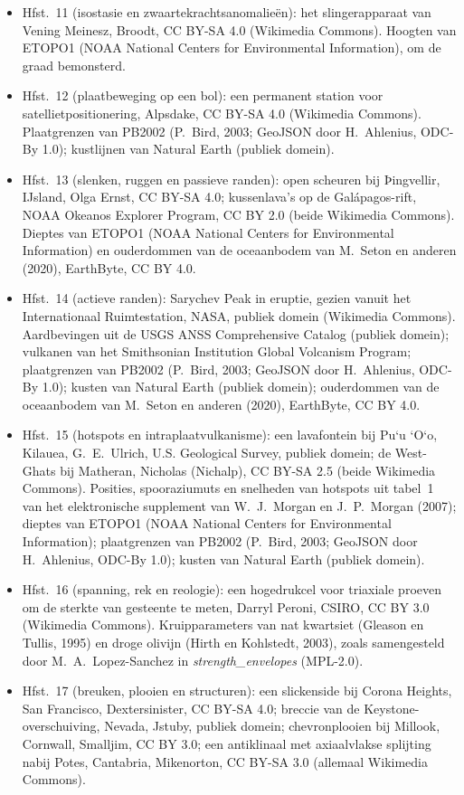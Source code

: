 \begin{itemize}
  \item Hfst.~11 (isostasie en zwaartekrachtsanomalieën): het slingerapparaat van Vening Meinesz, Broodt, CC BY-SA 4.0 (Wikimedia Commons). Hoogten van ETOPO1 (NOAA National Centers for Environmental Information), om de graad bemonsterd.
  \item Hfst.~12 (plaatbeweging op een bol): een permanent station voor satellietpositionering, Alpsdake, CC BY-SA 4.0 (Wikimedia Commons). Plaatgrenzen van PB2002 (P.~Bird, 2003; GeoJSON door H.~Ahlenius, ODC-By 1.0); kustlijnen van Natural Earth (publiek domein).
  \item Hfst.~13 (slenken, ruggen en passieve randen): open scheuren bij Þingvellir, IJsland, Olga Ernst, CC BY-SA 4.0; kussenlava's op de Galápagos-rift, NOAA Okeanos Explorer Program, CC BY 2.0 (beide Wikimedia Commons). Dieptes van ETOPO1 (NOAA National Centers for Environmental Information) en ouderdommen van de oceaanbodem van M.~Seton en anderen (2020), EarthByte, CC BY 4.0.
  \item Hfst.~14 (actieve randen): Sarychev Peak in eruptie, gezien vanuit het Internationaal Ruimtestation, NASA, publiek domein (Wikimedia Commons). Aardbevingen uit de USGS ANSS Comprehensive Catalog (publiek domein); vulkanen van het Smithsonian Institution Global Volcanism Program; plaatgrenzen van PB2002 (P.~Bird, 2003; GeoJSON door H.~Ahlenius, ODC-By 1.0); kusten van Natural Earth (publiek domein); ouderdommen van de oceaanbodem van M.~Seton en anderen (2020), EarthByte, CC BY 4.0.
  \item Hfst.~15 (hotspots en intraplaatvulkanisme): een lavafontein bij Pu\textquoteleft u \textquoteleft O\textquoteleft o, Kilauea, G.~E.~Ulrich, U.S. Geological Survey, publiek domein; de West-Ghats bij Matheran, Nicholas (Nichalp), CC BY-SA 2.5 (beide Wikimedia Commons). Posities, spooraziumuts en snelheden van hotspots uit tabel~1 van het elektronische supplement van W.~J.~Morgan en J.~P.~Morgan (2007); dieptes van ETOPO1 (NOAA National Centers for Environmental Information); plaatgrenzen van PB2002 (P.~Bird, 2003; GeoJSON door H.~Ahlenius, ODC-By 1.0); kusten van Natural Earth (publiek domein).
  \item Hfst.~16 (spanning, rek en reologie): een hogedrukcel voor triaxiale proeven om de sterkte van gesteente te meten, Darryl Peroni, CSIRO, CC BY 3.0 (Wikimedia Commons). Kruipparameters van nat kwartsiet (Gleason en Tullis, 1995) en droge olivijn (Hirth en Kohlstedt, 2003), zoals samengesteld door M.~A.~Lopez-Sanchez in \emph{strength\_envelopes} (MPL-2.0).
  \item Hfst.~17 (breuken, plooien en structuren): een slickenside bij Corona Heights, San Francisco, Dextersinister, CC BY-SA 4.0; breccie van de Keystone-overschuiving, Nevada, Jstuby, publiek domein; chevronplooien bij Millook, Cornwall, Smalljim, CC BY 3.0; een antiklinaal met axiaalvlakse splijting nabij Potes, Cantabria, Mikenorton, CC BY-SA 3.0 (allemaal Wikimedia Commons).

\end{itemize}
